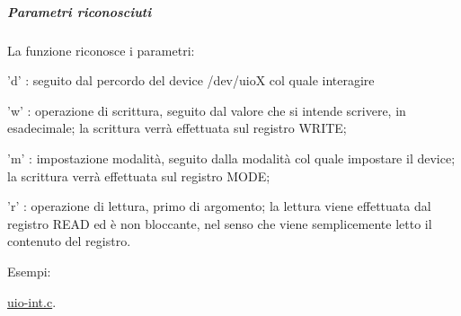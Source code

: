 \subparagraph*{Parametri riconosciuti}

La funzione riconosce i parametri\+:
\begin{DoxyItemize}
\item 'd' \+: seguito dal percordo del device /dev/uio\+X col quale interagire
\item 'w' \+: operazione di scrittura, seguito dal valore che si intende scrivere, in esadecimale; la scrittura verrà effettuata sul registro W\+R\+I\+T\+E;
\item 'm' \+: impostazione modalità, seguito dalla modalità col quale impostare il device; la scrittura verrà effettuata sul registro M\+O\+D\+E;
\item 'r' \+: operazione di lettura, primo di argomento; la lettura viene effettuata dal registro R\+E\+A\+D ed è non bloccante, nel senso che viene semplicemente letto il contenuto del registro.
\end{DoxyItemize}\begin{Desc}
\item[Esempi\+: ]\par
\hyperlink{uio-int_8c-example}{uio-\/int.\+c}.\end{Desc}
